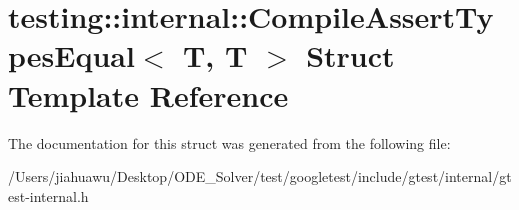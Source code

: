 \hypertarget{structtesting_1_1internal_1_1_compile_assert_types_equal_3_01_t_00_01_t_01_4}{}\section{testing\+:\+:internal\+:\+:Compile\+Assert\+Types\+Equal$<$ T, T $>$ Struct Template Reference}
\label{structtesting_1_1internal_1_1_compile_assert_types_equal_3_01_t_00_01_t_01_4}


The documentation for this struct was generated from the following file\+:\begin{DoxyCompactItemize}
\item 
/\+Users/jiahuawu/\+Desktop/\+O\+D\+E\+\_\+\+Solver/test/googletest/include/gtest/internal/gtest-\/internal.\+h\end{DoxyCompactItemize}
